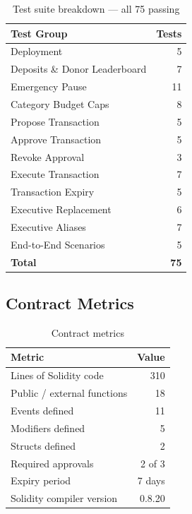 \documentclass[12pt,a4paper]{article}
\begin{document}
\begin{table}[h]
  \centering
  \begin{tabular}{lr}
    \toprule
    Test Group & Tests \\
    \midrule
    Deployment                  & 5  \\
    Deposits \& Donor Leaderboard & 7  \\
    Emergency Pause             & 11 \\
    Category Budget Caps        & 8  \\
    Propose Transaction         & 5  \\
    Approve Transaction         & 5  \\
    Revoke Approval             & 3  \\
    Execute Transaction         & 7  \\
    Transaction Expiry          & 5  \\
    Executive Replacement       & 6  \\
    Executive Aliases           & 7  \\
    End-to-End Scenarios        & 5  \\
    \midrule
    \textbf{Total}              & \textbf{75} \\
    \bottomrule
  \end{tabular}
  \caption{Test suite breakdown — all 75 passing}
\end{table}

\subsection{Contract Metrics}

\begin{table}[h]
  \centering
  \begin{tabular}{lr}
    \toprule
    Metric & Value \\
    \midrule
    Lines of Solidity code    & 310 \\
    Public / external functions & 18 \\
    Events defined            & 11 \\
    Modifiers defined         & 5  \\
    Structs defined           & 2  \\
    Required approvals        & 2 of 3 \\
    Expiry period             & 7 days \\
    Solidity compiler version & 0.8.20 \\
    \bottomrule
  \end{tabular}
  \caption{Contract metrics}
\end{table}
\end{document}
